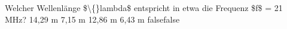     {Welcher Wellenlänge \$\textbackslash\{\}lambda\$ entspricht in etwa die Frequenz \$f\$ = 21 MHz?}
    {14,29 m}
    {7,15 m}
    {12,86 m}
    {6,43 m}
    {false}{false}
